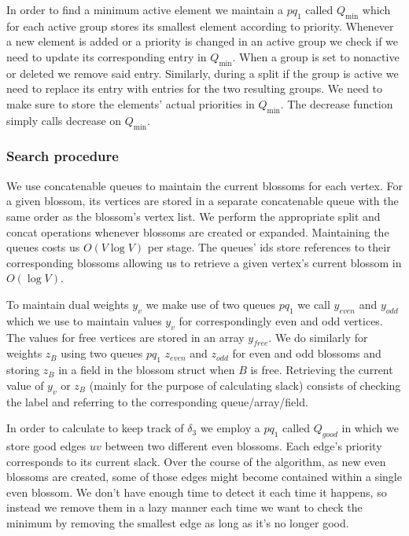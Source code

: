 In order to find a minimum active element we maintain a $pq_1$ called $Q_{\min}$ which for each active group stores its smallest element according to priority. Whenever a new element is added or a priority is changed in an active group we check if we need to update its corresponding entry in $Q_{\min}$. When a group is set to nonactive or deleted we remove said entry. Similarly, during a split if the group is active we need to replace its entry with entries for the two resulting groups. We need to make sure to store the elements' actual priorities in $Q_{\min}$. The decrease function simply calls decrease on $Q_{\min}$.

\subsubsection{Search procedure}

We use concatenable queues to maintain the current blossoms for each vertex. For a given blossom, its vertices are stored in a separate concatenable queue with the same order as the blossom's vertex list. We perform the appropriate split and concat operations whenever blossoms are created or expanded. Maintaining the queues costs us $O(V\log V)$ per stage. The queues' ids store references to their corresponding blossoms allowing us to retrieve a given vertex's current blossom in $O(\log V)$.

To maintain dual weights $y_v$ we make use of two queues $pq_1$ we call $y_{even}$ and $y_{odd}$ which we use to maintain values $y_v$ for correspondingly even and odd vertices. The values for free vertices are stored in an array $y_{free}$. We do similarly for weights $z_B$ using two queues $pq_1$ $z_{even}$ and $z_{odd}$ for even and odd blossoms and storing $z_B$ in a field in the blossom struct when $B$ is free. Retrieving the current value of $y_v$ or $z_B$ (mainly for the purpose of calculating slack) consists of checking the label and referring to the corresponding queue/array/field.

In order to calculate to keep track of $\delta_3$ we employ a $pq_1$ called $Q_{good}$ in which we store good edges $uv$ between two different even blossoms. Each edge's priority corresponds to its current slack. Over the course of the algorithm, as new even blossoms are created, some of those edges might become contained within a single even blossom. We don't have enough time to detect it each time it happens, so instead we remove them in a lazy manner each time we want to check the minimum by removing the smallest edge as long as it's no longer good.

